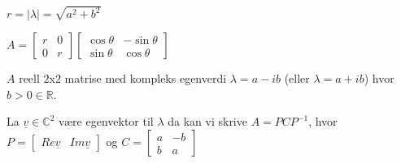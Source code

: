 \documentclass[11pt, a4paper, norsk]{article}
\begin{document}
        $r = |\lambda| = \sqrt{a^2 + b^2}$

        $A = \begin{bmatrix}
            r & 0 \\
            0 & r
        \end{bmatrix} \begin{bmatrix}
            \cos{\theta} & -\sin{\theta} \\
            \sin{\theta} & \cos{\theta}
        \end{bmatrix}$

        \begin{Theorem}{}{}
            $A$ reell $2$x$2$ matrise med kompleks egenverdi $\lambda = a-ib$ (eller $\lambda = a+ib$) hvor $b>0 \in \mathbb{R}$. 
            
            La $\underline{v} \in \mathbb{C}^2$ være egenvektor til $\lambda$ da kan vi skrive $A = PCP^{-1}$, hvor $P = \begin{bmatrix}
                Re\underline{v} & Im\underline{v}
            \end{bmatrix}$ og $C = \begin{bmatrix}
                a & -b \\
                b & a
            \end{bmatrix}$ 
        \end{Theorem}
        
\end{document}
